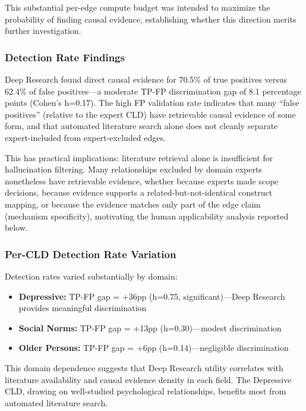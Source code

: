 This substantial per-edge compute budget was intended to maximize the probability of finding causal evidence, establishing whether this direction merits further investigation.

\subsubsection{Detection Rate Findings}

Deep Research found direct causal evidence for 70.5\% of true positives versus 62.4\% of false positives---a moderate TP-FP discrimination gap of 8.1 percentage points (Cohen's h=0.17). The high FP validation rate indicates that many ``false positives'' (relative to the expert CLD) have retrievable causal evidence of some form, and that automated literature search alone does not cleanly separate expert-included from expert-excluded edges.

This has practical implications: literature retrieval alone is insufficient for hallucination filtering. Many relationships excluded by domain experts nonetheless have retrievable evidence, whether because experts made scope decisions, because evidence supports a related-but-not-identical construct mapping, or because the evidence matches only part of the edge claim (mechanism specificity), motivating the human applicability analysis reported below.

\subsubsection{Per-CLD Detection Rate Variation}

Detection rates varied substantially by domain:
\begin{itemize}[noitemsep]
    \item \textbf{Depressive:} TP-FP gap = +36pp (h=0.75, significant)---Deep Research provides meaningful discrimination
    \item \textbf{Social Norms:} TP-FP gap = +13pp (h=0.30)---modest discrimination
    \item \textbf{Older Persons:} TP-FP gap = +6pp (h=0.14)---negligible discrimination
\end{itemize}

This domain dependence suggests that Deep Research utility correlates with literature availability and causal evidence density in each field. The Depressive CLD, drawing on well-studied psychological relationships, benefits most from automated literature search.


